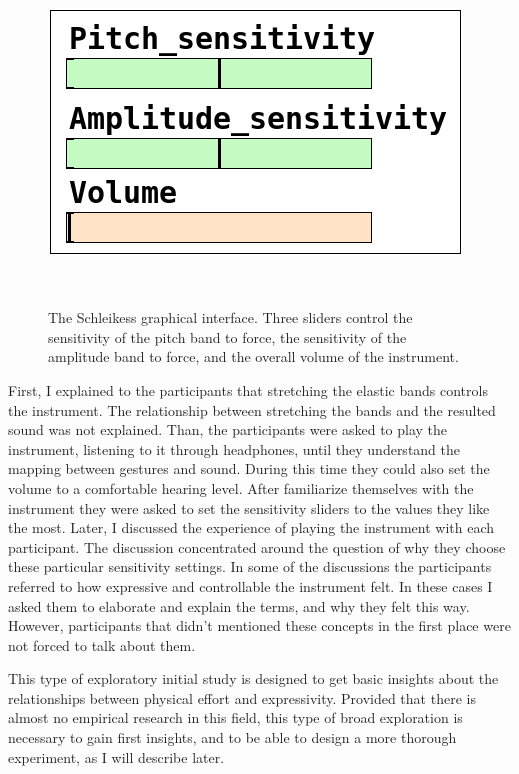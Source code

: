 \documentclass{sigchi}
\begin{document}
\begin{figure}
  \centering
  \includegraphics[width=0.9\columnwidth]{figures/pd_interface}
  \caption{The Schleikess graphical interface. Three sliders control the sensitivity of the pitch band to force, the sensitivity of the amplitude band to force, and the overall volume of the instrument.}~\label{fig:pd-interface}
\end{figure}

First, I explained to the participants that stretching the elastic bands controls the instrument.
The relationship between stretching the bands and the resulted sound was not explained.
Than, the participants were asked to play the instrument, listening to it through headphones, until they understand the mapping between gestures and sound.
During this time they could also set the volume to a comfortable hearing level.
After familiarize themselves with the instrument they were asked to set the sensitivity sliders to the values they like the most.
Later, I discussed the experience of playing the instrument with each participant.
The discussion concentrated around the question of why they choose these particular sensitivity settings.
In some of the discussions the participants referred to how expressive and controllable the instrument felt.
In these cases I asked them to elaborate and explain the terms, and why they felt this way.
However, participants that didn't mentioned these concepts in the first place were not forced to talk about them.

This type of exploratory initial study is designed to get basic insights about the relationships between physical effort and expressivity.
Provided that there is almost no empirical research in this field, this type of broad exploration is necessary to gain first insights, and to be able to design a more thorough experiment, as I will describe later.
\end{document}

